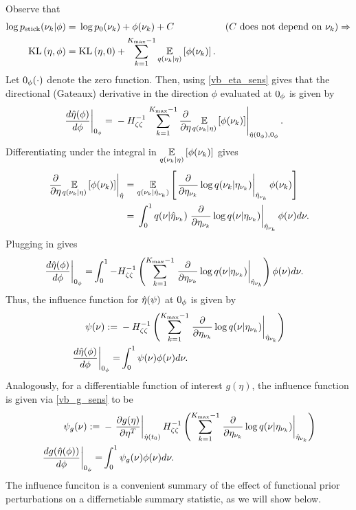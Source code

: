Observe that
%
\begin{align*}
%
\log \pstick(\nuk \vert \phi) ={}&
    \log \pb(\nuk) + \phi(\nuk) + \const
    & \constdesc{\nuk} \Rightarrow\\
\KL{\eta, \phi} ={}&
    \KL{\eta, 0} + \sumkm \expect{\q(\nuk \vert \eta)}{\phi(\nuk)}.
%
\end{align*}
%
Let $0_\phi(\cdot)$ denote the zero function.  Then, using \eqref{vb_eta_sens}
gives that the directional (Gateaux) derivative in the direction $\phi$
evaluated at $0_\phi$ is given by
%
\begin{align*}
%
\fracat{d \etaopt(\phi)}{d \phi}{\phiz} ={}&
    - \hess{\zeta\zeta}^{-1}
    \evalat{
        \sumkm \frac{\partial}{\partial \eta}
            \expect{\q(\nuk \vert \eta)}{\phi(\nuk)}}
           {\etaopt(\phiz), \phiz}.
%
\end{align*}
%
Differentiating under the integral in $\underset{q(\nu_{k} \vert
\eta)}{\mathbb{E}}\left[\phi(\nu_{k})\right]$ gives
%
\begin{align*}
%
\evalat{
\frac{\partial}{\partial \eta}
    \expect{\q(\nuk \vert \eta)}{\phi(\nuk)}
}{\etaopt} ={}&
\expect{\q(\nuk \vert \etaoptnuk)}
       {\evalat{\frac{\partial}{\partial \etanuk}
                  \log\q(\nuk \vert \etanuk)}
                {\etaoptnuk}
        \phi(\nuk)} \\
={}&
\int_0^1
    \q(\nu \vert \etaoptnuk)
    \evalat{\frac{\partial}{\partial \etanuk}
               \log\q(\nu \vert \etanuk)}
             {\etaoptnuk}
    \phi(\nu) d\nu.
%
\end{align*}
%
Plugging in gives
%
\begin{align*}
%
\fracat{d \etaopt(\phi)}{d \phi}{\phiz} =&{}
    \int_0^1
    -\hess{\zeta\zeta}^{-1}
    \left(
        \sumkm
        \evalat{\frac{\partial}{\partial \etanuk}
                   \log\q(\nu \vert \etanuk)}
                 {\etaoptnuk}
    \right) \phi(\nu) d\nu.
%
\end{align*}
%
Thus, the influence function for $\hat\eta(\psi)$ at $0_\phi$ is given by
%
\begin{align*}
%
\infl(\nu) :={}&
-\hess{\zeta\zeta}^{-1}
\left(
    \sumkm
    \evalat{\frac{\partial}{\partial \etanuk}
               \log\q(\nu \vert \etanuk)}
             {\etaoptnuk}
\right) \\
\fracat{d \etaopt(\phi)}{d \phi}{\phiz} =&{}
    \int_0^1 \infl(\nu) \phi(\nu) d\nu.
%
\end{align*}
%
Analogously, for a differentiable function of interest $g(\eta)$,
the influence function is given via \eqref{vb_g_sens} to be
%
\begin{align*}
%
\inflg(\nu) :={}&
-\fracat{\partial g(\eta)}{\partial \eta^T}{\etaopt(\t_0)}
    \hess{\zeta\zeta}^{-1}
\left(
    \sumkm
    \evalat{\frac{\partial}{\partial \etanuk}
               \log\q(\nu \vert \etanuk)}
             {\etaoptnuk}
\right) \\
\fracat{d g(\etaopt(\phi))}{d \phi}{\phiz} =&{}
    \int_0^1 \inflg(\nu) \phi(\nu) d\nu.
%
\end{align*}
%
The influence funciton is a convenient summary of the effect of
functional prior perturbations on a differnetiable summary statistic, as
we will show below.


